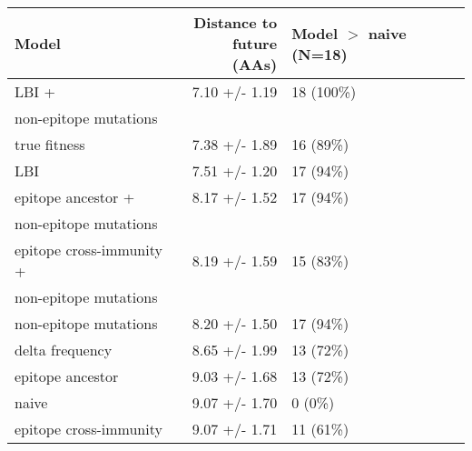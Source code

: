 \begin{tabular*}{0.7\textwidth}{lrl}
\toprule
                             Model & \makecell{Distance to \\ future (AAs)} & \makecell[l]{Model $>$ naive \\ (N=18)} \\
\midrule
                             LBI + &                          7.10 +/- 1.19 &                              18 (100\%) \\
 \hspace{3mm}non-epitope mutations &                                        &                                         \\
                      true fitness &                          7.38 +/- 1.89 &                               16 (89\%) \\
                               LBI &                          7.51 +/- 1.20 &                               17 (94\%) \\
                epitope ancestor + &                          8.17 +/- 1.52 &                               17 (94\%) \\
 \hspace{3mm}non-epitope mutations &                                        &                                         \\
          epitope cross-immunity + &                          8.19 +/- 1.59 &                               15 (83\%) \\
 \hspace{3mm}non-epitope mutations &                                        &                                         \\
             non-epitope mutations &                          8.20 +/- 1.50 &                               17 (94\%) \\
                   delta frequency &                          8.65 +/- 1.99 &                               13 (72\%) \\
                  epitope ancestor &                          9.03 +/- 1.68 &                               13 (72\%) \\
                             naive &                          9.07 +/- 1.70 &                                 0 (0\%) \\
            epitope cross-immunity &                          9.07 +/- 1.71 &                               11 (61\%) \\
\bottomrule
\end{tabular*}
